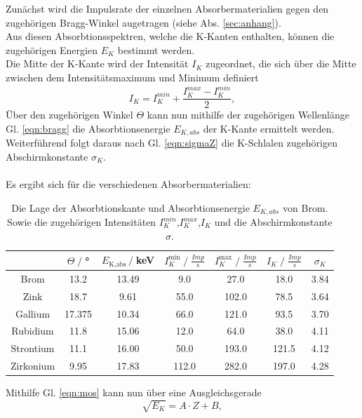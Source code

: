 Zunächst wird die Impulsrate der einzelnen Absorbermaterialien gegen den zugehörigen
Bragg-Winkel augetragen (siehe Abs. \ref{sec:anhang}).\\ Aus diesen Absorbtionsspektren, welche die K-Kanten enthalten, können
die zugehörigen Energien $E_K$ bestimmt werden.\\
Die Mitte der K-Kante wird der Intensität $I_K$ zugeordnet, die sich
über die Mitte zwischen dem Intensitätsmaximum und Minimum definiert
\begin{equation}
    I_K=I_K^{min}+\frac{I_K^{max}-I_K^{min}}{2},
    \label{eqn:intensität}
\end{equation}
Über den zugehörigen Winkel $\Theta$ kann nun mithilfe der zugehörigen Wellenlänge
Gl. \ref{eqn:bragg} die Absorbtionsenergie $E_{K,abs}$ der K-Kante ermittelt werden.
Weiterführend folgt daraus nach Gl. \ref{eqn:sigmaZ} die K-Schlalen zugehörigen Abschirmkonstante $\sigma_K$.\\\\
Es ergibt sich für die verschiedenen Absorbermaterialien:
\begin{table}
    \centering
    \begin{tabular}{c | c c c c c c}
        \toprule
        &$\Theta\;/\;$° & $E_{\text{K,abs}}\,/\;$keV & $I_K^{\text{min}}\;/\;\frac{Imp}{s}$ & $I_K^{\text{max}}\;/\;\frac{Imp}{s}$ & $I_K\;/\;\frac{Imp}{s}$ & $\sigma_K$\\
        \midrule
        Brom & 13.2 & 13.49 & 9.0 & 27.0 & 18.0 & 3.84\\
        Zink & 18.7 & 9.61 & 55.0 & 102.0 & 78.5 & 3.64\\
        Gallium & 17.375 & 10.34 & 66.0 & 121.0 & 93.5 & 3.70\\
        Rubidium & 11.8 & 15.06 & 12.0 & 64.0 & 38.0 & 4.11\\
        Strontium & 11.1 & 16.00 & 50.0 & 193.0 & 121.5 & 4.12\\
        Zirkonium & 9.95 & 17.83 & 112.0 & 282.0 & 197.0 & 4.28\\
        \bottomrule
    \end{tabular}
    \caption{Die Lage der Absorbtionskante und Absorbtionsenergie $E_{K,abs}$ von Brom.
        Sowie die zugehörigen Intensitäten $I_K^{min}$,$I_K^{max}$,$I_K$ und die Abschirmkonstante $\sigma$.}
\end{table}
\newpage
Mithilfe Gl. \ref{eqn:mos} kann nun über eine Ausgleichsgerade
\begin{equation}
        \sqrt{E_K}=A\cdot Z +B,
\end{equation}
